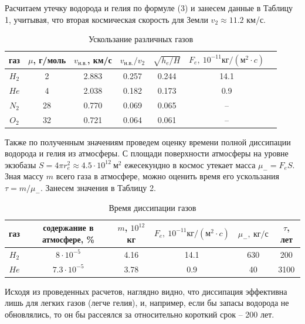 \documentclass[12pt,a4paper]{article}
\begin{document}
Расчитаем утечку водорода и гелия по формуле (3) и занесем данные в Таблицу 1, учитывая, что вторая космическая скорость для Земли $v_2\approx 11.2$ км/с.

\begin{table}[h!]
    \centering
    \begin{tabular}{|c|c|c|c|c|c|c|}
        \hline
        газ & $\mu$, г/моль & $v_{н.в.}$, км/с & $v_{н.в.} / v_2$ & $\sqrt {h_e/H}$ & $F_e,\ 10^{-11}кг / (м^2\cdot c)$\\
        \hline
        $H_2$ & 2 & 2.883 & 0.257 & 0.244 & 14.1\\
        \hline 
        $He$ & 4 & 2.038 & 0.182 & 0.173 & 0.9 \\
        \hline 
        $N_2$ & 28 & 0.770 & 0.069 & 0.065 & --\\
        \hline 
        $O_2$ & 32 & 0.721 & 0.064 & 0.061 & --\\
        \hline 
    \end{tabular}
    \caption{Ускользание различных газов}
\end{table}

Также по полученным значениям проведем оценку времени полной диссипации водорода и гелия из атмосферы.
С площади поверхности атмосферы на уровне экзобазы $S = 4\pi r_e^2 \approx 4.5 \cdot 10^{12}\ м^2$ ежесекундно в космос утекает масса $\mu_- = F_e S$.
Зная массу $m$ всего газа в атмосфере, можно оценить время его ускользания $\tau = m / \mu_-$. Занесем значения в Таблицу 2.
\newline

\begin{table}[h!]
    \centering
    \begin{tabular}{|c|c|c|c|c|c|}
        \hline
        газ & содержание в атмосфере, \% & $m$, $10^{12}$ кг & $F_e,\ 10^{-11}кг / (м^2\cdot c)$ & $\mu_-,\ кг/с$ & $\tau$, лет\\
        \hline
        $H_2$ & $8\cdot 10^{-5}$ & 4.16 & 14.1 & 630 & 200\\
        \hline 
        $He$ & $7.3\cdot 10^{-5}$ & 3.78 & 0.9 & 40 & 3100\\
        \hline 
    \end{tabular}
    \caption{Время диссипации газов}
\end{table}

Исходя из проведенных расчетов, наглядно видно, что диссипация эффективна лишь для легких газов (легче гелия), и, например, если бы запасы водорода не обновлялись, то он бы рассеялся за относительно короткий срок -- 200 лет.
\end{document}
